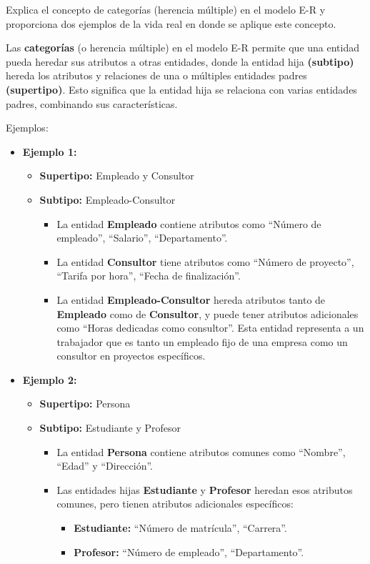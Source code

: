 Explica el concepto de categorías (herencia múltiple) en el modelo E-R y proporciona dos ejemplos de la vida real en donde se aplique este concepto.

Las \textbf{categorías} (o herencia múltiple) en el modelo E-R permite que una entidad pueda heredar sus atributos a otras entidades, donde la entidad hija \textbf{(subtipo)} hereda los atributos y relaciones de una o múltiples entidades padres \textbf{(supertipo)}. Esto significa que la entidad hija se relaciona con varias entidades padres, combinando sus características.

Ejemplos:
\begin{itemize}
    \item \textbf{Ejemplo 1:}
    \begin{itemize}
        \item \textbf{Supertipo:} Empleado y Consultor
        \item \textbf{Subtipo:} Empleado-Consultor
        
    \begin{itemize}
        \item La entidad \textbf{Empleado} contiene atributos como ``Número de empleado'', ``Salario'', ``Departamento''.
        \item La entidad \textbf{Consultor} tiene atributos como ``Número de proyecto'', ``Tarifa por hora'', ``Fecha de finalización''.
        \item La entidad \textbf{Empleado-Consultor} hereda atributos tanto de \textbf{Empleado} como de \textbf{Consultor}, y puede tener atributos adicionales como ``Horas dedicadas como consultor''. Esta entidad representa a un trabajador que es tanto un empleado fijo de una empresa como un consultor en proyectos específicos.
    \end{itemize}
    \end{itemize}

    \item \textbf{Ejemplo 2:}
    \begin{itemize}
         \item \textbf{Supertipo:} Persona
        \item \textbf{Subtipo:} Estudiante y Profesor
        
    \begin{itemize}
        \item La entidad \textbf{Persona} contiene atributos comunes como ``Nombre'', ``Edad'' y ``Dirección''.
        \item Las entidades hijas \textbf{Estudiante} y \textbf{Profesor} heredan esos atributos comunes, pero tienen atributos adicionales específicos:
        \begin{itemize}
            \item \textbf{Estudiante:} ``Número de matrícula'', ``Carrera''.
            \item \textbf{Profesor:} ``Número de empleado'', ``Departamento''.
        \end{itemize}
    \end{itemize}
    \end{itemize}
\end{itemize}

